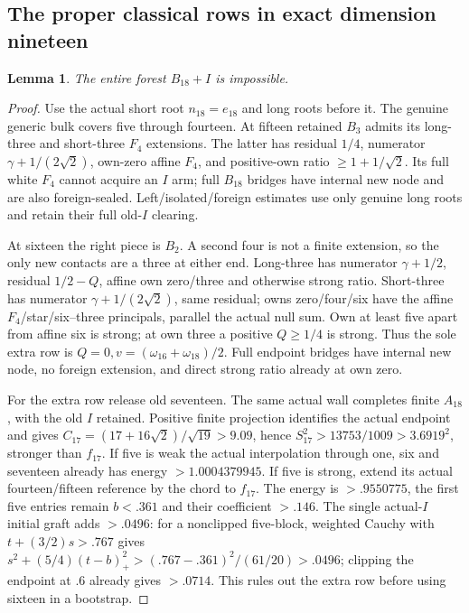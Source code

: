 \documentclass[11pt]{article}
\newtheorem{lemma}[theorem]{Lemma}
\theoremstyle{definition}
\theoremstyle{remark}
\begin{document}
\subsection{The proper classical rows in exact dimension nineteen}
\begin{lemma}\label{app:tail:lem:B18I}
The entire forest $B_{18}+I$ is impossible.
\end{lemma}
\begin{proof}
Use the actual short root $n_{18}=e_{18}$ and long roots before it.
The genuine generic bulk covers five through fourteen.
At fifteen retained $B_3$ admits its long-three and short-three
$F_4$ extensions. The latter has residual $1/4$, numerator
$\gamma+1/(2\sqrt2)$, own-zero affine $F_4$, and positive-own
ratio $\ge1+1/\sqrt2$. Its full white $F_4$ cannot acquire
an $I$ arm; full $B_{18}$ bridges have internal new node and
are also foreign-sealed. Left/isolated/foreign estimates use
only genuine long roots and retain their full old-$I$ clearing.

At sixteen the right piece is $B_2$. A second four is not a
finite extension, so the only new contacts are a three at either
end. Long-three has numerator $\gamma+1/2$, residual
$1/2-Q$, affine own zero/three and otherwise strong ratio.
Short-three has numerator $\gamma+1/(2\sqrt2)$, same residual;
owns zero/four/six have the affine $F_4$/star/six--three
principals, parallel the actual null sum. Own at least five
apart from affine six is strong; at own three a positive
$Q\ge1/4$ is strong. Thus the sole extra row is
$Q=0,v=(\omega_{16}+\omega_{18})/2$.
Full endpoint bridges have internal new node, no foreign
extension, and direct strong ratio already at own zero.

For the extra row release old seventeen. The same actual wall
completes finite $A_{18}$, with the old $I$ retained.
Positive finite projection identifies the actual endpoint and
gives $C_{17}=(17+16\sqrt2)/\sqrt{19}>9.09$, hence
$S_{17}^2>13753/1009>3.6919^2$, stronger than $f_{17}$.
If five is weak the actual interpolation through one, six and seventeen already
has energy $>1.0004379945$.
If five is strong, extend its actual fourteen/fifteen reference
by the chord to $f_{17}$. The energy is $>.9550775$, the first
five entries remain $b<.361$ and their coefficient $>.146$.
The single actual-$I$ initial graft adds $>.0496$: for a
nonclipped five-block, weighted Cauchy with
$t+(3/2)s>.767$ gives
$s^2+(5/4)(t-b)_+^2>(.767-.361)^2/(61/20)>.0496$;
clipping the endpoint at $.6$ already gives $>.0714$.
This rules out the extra row before using sixteen in a bootstrap.


\end{proof}
\end{document}
